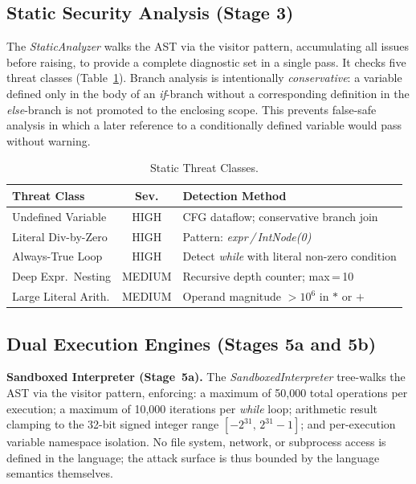 \documentclass[conference]{IEEEtran}
\begin{document}
\subsection{Static Security Analysis (Stage 3)}

The \textit{StaticAnalyzer} walks the AST via the visitor pattern,
accumulating all issues before raising, to provide a complete
diagnostic set in a single pass. It checks five threat classes
(Table~\ref{tab:static}). Branch analysis is intentionally
\emph{conservative}: a variable defined only in the body of an
\textit{if}-branch without a corresponding definition in the
\textit{else}-branch is not promoted to the enclosing scope. This
prevents false-safe analysis in which a later reference to a
conditionally defined variable would pass without warning.

\begin{table}[t]
\caption{Static Threat Classes.}
\label{tab:static}
\centering
\renewcommand{\arraystretch}{1.18}
\small
\begin{tabular}{@{} p{2.15cm} c p{3.15cm} @{}}
\toprule
\textbf{Threat Class} & \textbf{Sev.} & \textbf{Detection Method} \\
\midrule
Undefined Variable    & HIGH   & CFG dataflow; conservative branch
                                 join \\[2pt]
Literal Div-by-Zero   & HIGH   & Pattern: \textit{expr\,/\,IntNode(0)}
                                 \\[2pt]
Always-True Loop      & HIGH   & Detect \textit{while} with literal
                                 non-zero condition \\[2pt]
Deep Expr.\ Nesting   & MEDIUM & Recursive depth counter; max\,=\,10
                                 \\[2pt]
Large Literal Arith.  & MEDIUM & Operand magnitude $>10^{6}$ in
                                 $*$ or $+$ \\
\bottomrule
\end{tabular}
\end{table}

\subsection{Dual Execution Engines (Stages 5a and 5b)}

\textbf{Sandboxed Interpreter (Stage~5a).} The
\textit{SandboxedInterpreter} tree-walks the AST via the visitor
pattern, enforcing: a maximum of 50,000 total operations per
execution; a maximum of 10,000 iterations per \textit{while} loop;
arithmetic result clamping to the 32-bit signed integer range
$[-2^{31},\,2^{31}-1]$; and per-execution variable namespace
isolation. No file system, network, or subprocess access is defined
in the language; the attack surface is thus bounded by the language
semantics themselves.
\end{document}
